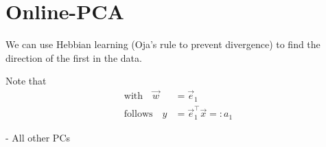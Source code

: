 
\section{Online-PCA}


\begin{frame}
We can use Hebbian learning (Oja's rule to prevent divergence) 
to find the direction of the first  in the data. \\

\pause

Note that
\begin{align}\text{with} \quad \vec w &= \vec e_1\\
\text{follows} \quad y &= \vec e_1^\top \vec x =: a_1
\end{align}


\pause

- All other PCs

\end{frame}

